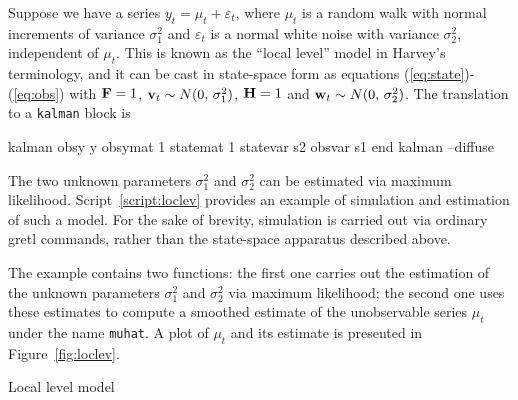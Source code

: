 Suppose we have a series $y_t = \mu_t + \varepsilon_t$, where $\mu_t$
is a random walk with normal increments of variance $\sigma^2_1$ and $
\varepsilon_t$ is a normal white noise with variance $\sigma^2_2$,
independent of $\mu_t$. This is known as the ``local level'' model in
Harvey's \citeyearpar{harvey89} terminology, and it can be cast in
state-space form as equations (\ref{eq:state})-(\ref{eq:obs}) with
$\mathbf{F} = 1$, $\mathbf{v}_t \sim N(0,\, \sigma^2_1)$, $\mathbf{H} = 1$
and $\mathbf{w}_t \sim N(0,\, \sigma^2_2)$.  The translation to a
\texttt{kalman} block is
\begin{code}
kalman
   obsy y
   obsymat 1
   statemat 1
   statevar s2
   obsvar s1
end kalman --diffuse
\end{code}

The two unknown parameters $\sigma^2_1$ and $\sigma^2_2$ can be
estimated via maximum likelihood.  Script~\ref{script:loclev} provides
an example of simulation and estimation of such a model. For the sake
of brevity, simulation is carried out via ordinary gretl commands,
rather than the state-space apparatus described above.

The example contains two functions: the first one carries out the
estimation of the unknown parameters $\sigma^2_1$ and $\sigma^2_2$ via
maximum likelihood; the second one uses these estimates to compute a
smoothed estimate of the unobservable series $\mu_t$ under the name
\texttt{muhat}. A plot of $\mu_t$ and its estimate is presented in
Figure~\ref{fig:loclev}.

\begin{script}[htbp]
  \caption{Local level model}
  \label{script:loclev}
\end{script}

